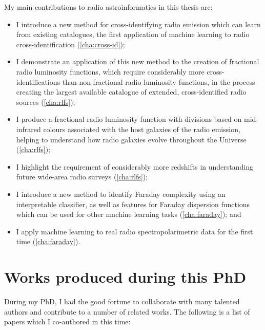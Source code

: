 \documentclass[11pt, a4paper]{book}
\begin{document}
My main contributions to radio astroinformatics in this thesis are:
\begin{itemize}
    \item I introduce a new method for cross-identifying radio emission which can learn from existing catalogues, the first application of machine learning to radio cross-identification (\autoref{cha:cross-id});
    \item I demonstrate an application of this new method to the creation of fractional radio luminosity functions, which require considerably more cross-identifications than non-fractional radio luminosity functions, in the process creating the largest available catalogue of extended, cross-identified radio sources (\autoref{cha:rlfs});
    \item I produce a fractional radio luminosity function with divisions based on mid-infrared colours associated with the host galaxies of the radio emission, helping to understand how radio galaxies evolve throughout the Universe (\autoref{cha:rlfs});
    \item I highlight the requirement of considerably more redshifts in understanding future wide-area radio surveys (\autoref{cha:rlfs});
    \item I introduce a new method to identify Faraday complexity using an interpretable classifier, as well as features for Faraday dispersion functions which can be used for other machine learning tasks (\autoref{cha:faraday}); and
    \item I apply machine learning to real radio spectropolarimetric data for the first time (\autoref{cha:faraday}).
\end{itemize}

\newpage

\section{Works produced during this PhD}
\label{sec:works}

During my PhD, I had the good fortune to collaborate with many talented authors and contribute to a number of related works. The following is a list of papers which I co-authored in this time:
\end{document}
